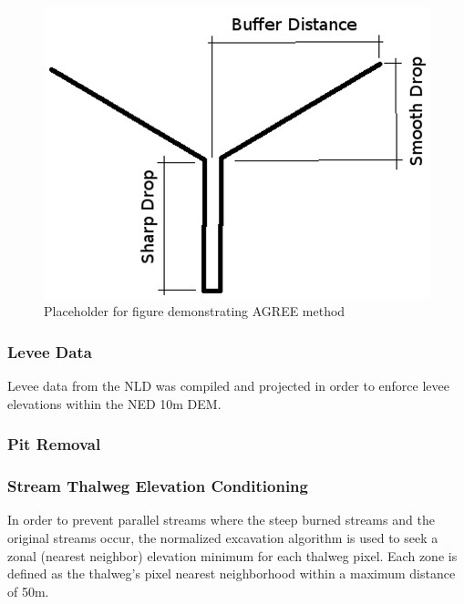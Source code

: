 \begin{figure}[h!]
\centering
\includegraphics[scale=1.0]{figures/agree_dem_cross_section.jpg}
\caption{Placeholder for figure demonstrating AGREE method}
\label{fig:agree_dem_cross_section}
\end{figure}


\subsubsection{Levee Data}

Levee data from the NLD was compiled and projected in order to enforce levee elevations within the NED 10m DEM.

\subsubsection{Pit Removal}
\cite{barnes2014efficient}

\subsubsection{Stream Thalweg Elevation Conditioning}

In order to prevent parallel streams where the steep burned streams and the original streams occur, the normalized excavation algorithm \cite{saunders1999preparation} is used to seek a zonal (nearest neighbor) elevation minimum for each thalweg pixel. 
Each zone is defined as the thalweg's pixel nearest neighborhood within a maximum distance of 50m.

